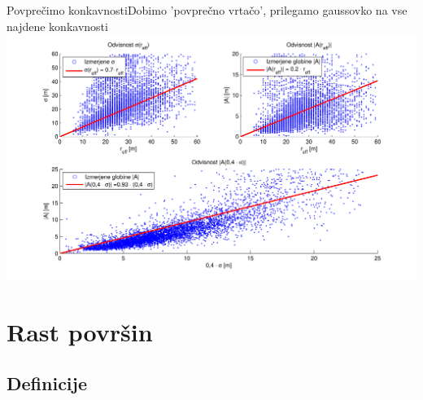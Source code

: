 \documentclass{beamer}
\begin{document}
\begin{frame}{Povprečimo konkavnosti}{Dobimo 'povprečno vrtačo', prilegamo gaussovko na vse najdene konkavnosti}
      \includegraphics[width=\textwidth]{slike/menisija-A-sigma-reff}
\end{frame}

\section{Rast površin}

\subsection{Definicije}
\end{document}
